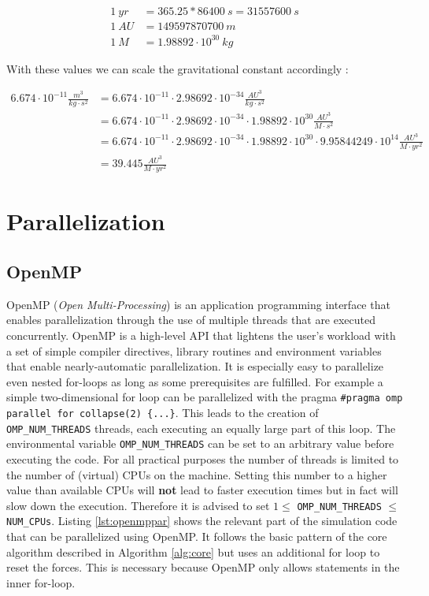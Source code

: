\documentclass[a4paper,11pt]{scrartcl} %
\begin{document}
\begin{align*}
	1~yr &= 365.25 * 86400~s = 31557600~s \\
	1~AU &= 149597870700~m \\
	1~M &=  1.98892 \cdot 10^{30}~kg
\end{align*}

With these values we can scale the gravitational constant accordingly \cite{astrounits}:

\begin{align*}
	6.674 \cdot 10^{-11} \frac{m^3}{kg \cdot s^2}
	& =  6.674 \cdot 10^{-11} \cdot 2.98692\cdot 10^{-34} \frac{AU^3}{kg \cdot s^2}\\
	& = 6.674 \cdot 10^{-11} \cdot 2.98692\cdot 10^{-34} \cdot 1.98892 \cdot 10^{30} \frac{AU^3}{M \cdot s^2} \\
	& = 6.674 \cdot 10^{-11} \cdot 2.98692\cdot 10^{-34} \cdot 1.98892 \cdot 10^{30} \cdot 9.95844249\cdot 10^{14} \frac{AU^3}{M \cdot yr^2}\\
	& = 39.445 \frac{AU^3}{M \cdot yr^2}
\end{align*}

\section{Parallelization}
\subsection{OpenMP}
OpenMP (\textit{Open Multi-Processing}) is an application programming interface that enables parallelization through the use of multiple threads that are executed concurrently. OpenMP is a high-level API that lightens the user's workload with a set of simple compiler directives, library routines and environment variables that enable nearly-automatic parallelization. It is especially easy to parallelize even nested for-loops as long as some prerequisites are fulfilled. For example a simple two-dimensional for loop can be parallelized with the pragma \texttt{\#pragma omp parallel for collapse(2) \{...\}}. This leads to the creation of \texttt{OMP\_NUM\_THREADS} threads, each executing an equally large part of this loop. The environmental variable \texttt{OMP\_NUM\_THREADS} can be set to an arbitrary value before executing the code. For all practical purposes the number of threads is limited to the number of (virtual) CPUs on the machine. Setting this number to a higher value than available CPUs will \textbf{not} lead to faster execution times but in fact will slow down the execution. Therefore it is advised to set $1 \leq $ \texttt{OMP\_NUM\_THREADS} $\leq $ \texttt{NUM\_CPUs}. Listing \ref{lst:openmppar} shows the relevant part of the simulation code that can be parallelized using OpenMP. It follows the basic pattern of the core algorithm described in Algorithm \ref{alg:core} but uses an additional for loop to reset the forces. This is necessary because OpenMP only allows statements in the inner for-loop.\\
\end{document}
